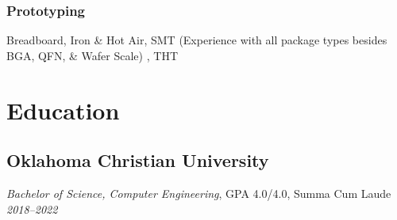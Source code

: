 \documentclass{article}
\begin{document}
\begin{spacing}{.5}
		\subsubsection{Prototyping} \small{Breadboard, Iron \& Hot Air, SMT} \scriptsize{(Experience with all package types besides BGA, QFN, \& Wafer Scale)} \small{, THT}

\section{Education}
	\subsection{Oklahoma Christian University}
		\textit{Bachelor of Science, Computer Engineering}, GPA 4.0/4.0, Summa Cum Laude \hfill \scriptsize{\textsl{2018--2022}}
\begin{comment}
		\subsection{Spring 2022}
			\begin{itemize}
				\item ELEC-3523 Digital Signal Processing
				\item CENG-4303 HDL Design of Microprocessors
				\item CENG-4753 Systems Design III
			\end{itemize}
		\subsection{Fall 2021}
			\begin{itemize}
				\item ELEC-4523 Software Engineering of Real-Time Systems
				\item CENG-4113 Software and Network Engineering
				\item CENG-4743 Systems Design II
			\end{itemize}
		\subsection{Spring 2021}
			\begin{itemize}
				\item CENG-3213 Computer Systems
				\item CENG-4223 Embedded Systems Design
				\item CENG-4213 Network Engineering
				\item ELEC-3313 Electronic Devices
				\item CMSC-4413 Operating Systems
				\item CENG-4732 Systems Design I
			\end{itemize}

\end{comment}
\end{spacing}
\end{document}
